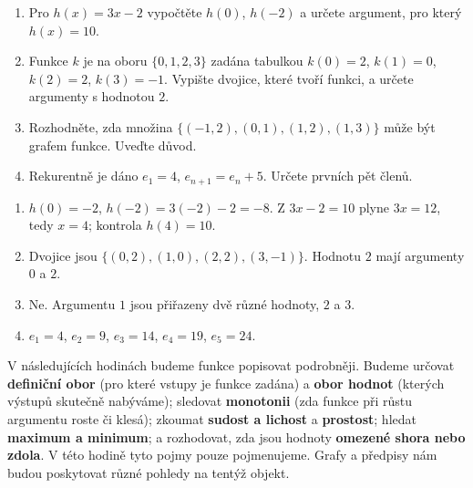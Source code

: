 \documentclass[11pt,a4paper]{article}
\begin{document}
\begin{zadaniReseniBox}
\begin{enumerate}[label=\alph*)]
\item Pro $h(x)=3x-2$ vypočtěte $h(0)$, $h(-2)$ a určete argument, pro který $h(x)=10$.
\item Funkce $k$ je na oboru $\{0,1,2,3\}$ zadána tabulkou $k(0)=2$, $k(1)=0$, $k(2)=2$, $k(3)=-1$. Vypište dvojice, které tvoří funkci, a určete argumenty s hodnotou $2$.
\item Rozhodněte, zda množina $\{(-1,2),(0,1),(1,2),(1,3)\}$ může být grafem funkce. Uveďte důvod.
\item Rekurentně je dáno $e_1=4$, $e_{n+1}=e_n+5$. Určete prvních pět členů.
\end{enumerate}
\tcblower
\begin{enumerate}[label=\alph*)]
\item $h(0)=-2$, $h(-2)=3(-2)-2=-8$. Z $3x-2=10$ plyne $3x=12$, tedy $x=4$; kontrola $h(4)=10$.
\item Dvojice jsou $\{(0,2),(1,0),(2,2),(3,-1)\}$. Hodnotu $2$ mají argumenty $0$ a $2$.
\item Ne. Argumentu $1$ jsou přiřazeny dvě různé hodnoty, $2$ a $3$.
\item $e_1=4$, $e_2=9$, $e_3=14$, $e_4=19$, $e_5=24$.
\end{enumerate}
\end{zadaniReseniBox}

V následujících hodinách budeme funkce popisovat podrobněji. Budeme určovat \textbf{definiční obor} (pro které vstupy je funkce zadána) a \textbf{obor hodnot} (kterých výstupů skutečně nabýváme); sledovat \textbf{monotonii} (zda funkce při růstu argumentu roste či klesá); zkoumat \textbf{sudost a lichost} a \textbf{prostost}; hledat \textbf{maximum a minimum}; a rozhodovat, zda jsou hodnoty \textbf{omezené shora nebo zdola}. V této hodině tyto pojmy pouze pojmenujeme. Grafy a předpisy nám budou poskytovat různé pohledy na tentýž objekt.

\end{document}
